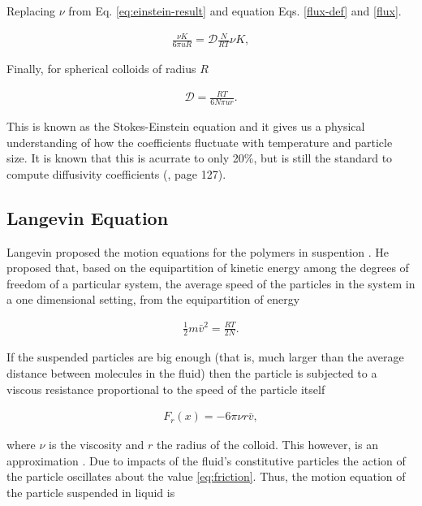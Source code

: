Replacing $\nu$ from Eq. \ref{eq:einstein-result} and equation Eqs. \ref{flux-def} and \ref{flux}.

\begin{align}
\frac{\nu K}{6\pi u R} = \mathcal{D}\frac{N}{RT}\nu K,
\end{align}

Finally, for spherical colloids of radius $R$

\begin{align}
	\mathcal{D} = \frac{RT}{6N\pi u r}.
\end{align}


This is known as the Stokes-Einstein equation and it gives us a physical understanding of how the coefficients fluctuate with temperature and particle size. It is known that this is acurrate to only 20\%, but is still the standard to compute diffusivity coefficients (\cite{cussler}, page 127).









\subsection{Langevin Equation}

Langevin proposed the motion equations for the polymers in suspention \cite{langevin_translation}. He proposed that, based on the equipartition of kinetic energy among the degrees of freedom of a particular system, the average speed of the particles in the system in a one dimensional setting, from the equipartition of energy

\begin{align}
	\frac{1}{2}m\bar{v}^2 = \frac{RT}{2N}.
\end{align}

If the suspended particles are big enough (that is, much larger than the average distance between molecules in the fluid) then the particle is subjected to a viscous resistance proportional to the speed of the particle itself

\begin{align}
	\label{eq:friction}
	F_r(x) = -6\pi\nu r \bar{v},
\end{align}

where $\nu$ is the viscosity and $r$ the radius of the colloid. This however, is an approximation \cite{langevin_original}. Due to impacts of the fluid's constitutive particles the action of the particle oscillates about the value \ref{eq:friction}. Thus, the motion equation of the particle suspended in liquid is

